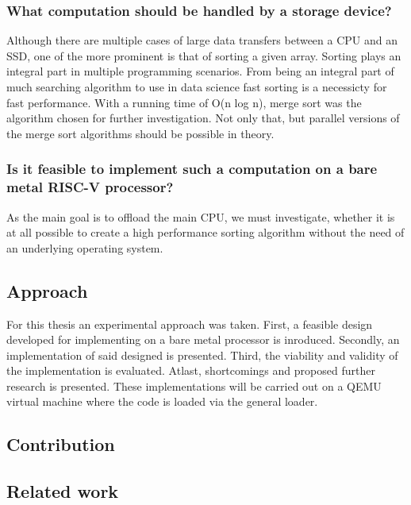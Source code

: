 \subsubsection*{What computation should be handled by a storage device?}
Although there are multiple cases of large data transfers between a CPU and an
SSD, one of the more prominent is that of sorting a given array. Sorting plays
an integral part in multiple programming scenarios. From being an integral part
of much searching algorithm to use in data science fast sorting is a necessicty
for fast performance. With a running time of O(n log n), merge sort was the
algorithm chosen for further investigation. Not only that, but parallel versions
of the merge sort algorithms should be possible in theory.

\subsubsection*{Is it feasible to implement such a computation on a bare metal
RISC-V processor?}
As the main goal is to offload the main CPU, we must investigate, whether it is
at all possible to create a high performance sorting algorithm without the need
of an underlying operating system.

\subsection{Approach}
For this thesis an experimental approach was taken. First, a feasible design
developed for implementing on a bare metal processor is inroduced. Secondly, an
implementation of said designed is presented. Third, the viability and validity
of the implementation is evaluated. Atlast, shortcomings and proposed
further research is presented. These implementations will be carried out on a
QEMU virtual machine where the code is loaded via the general loader.

\subsection{Contribution}


\subsection{Related work}


